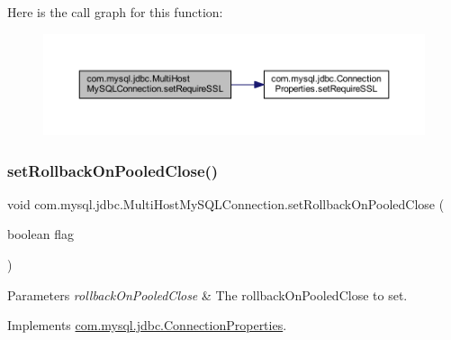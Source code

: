 Here is the call graph for this function\+:
\nopagebreak
\begin{figure}[H]
\begin{center}
\leavevmode
\includegraphics[width=350pt]{classcom_1_1mysql_1_1jdbc_1_1_multi_host_my_s_q_l_connection_a032636f890a49095b4a3574fa21b2ce8_cgraph}
\end{center}
\end{figure}
\mbox{\label{classcom_1_1mysql_1_1jdbc_1_1_multi_host_my_s_q_l_connection_a1e6e4b6adaf9cf037af7de68ede17aac}} 
\subsubsection{\texorpdfstring{set\+Rollback\+On\+Pooled\+Close()}{setRollbackOnPooledClose()}}
{\footnotesize\ttfamily void com.\+mysql.\+jdbc.\+Multi\+Host\+My\+S\+Q\+L\+Connection.\+set\+Rollback\+On\+Pooled\+Close (\begin{DoxyParamCaption}\item[{boolean}]{flag }\end{DoxyParamCaption})}


\begin{DoxyParams}{Parameters}
{\em rollback\+On\+Pooled\+Close} & The rollback\+On\+Pooled\+Close to set. \\
\hline
\end{DoxyParams}


Implements \mbox{\hyperlink{interfacecom_1_1mysql_1_1jdbc_1_1_connection_properties_ac8700288ba51d4baf2062fa2a2856b88}{com.\+mysql.\+jdbc.\+Connection\+Properties}}.

